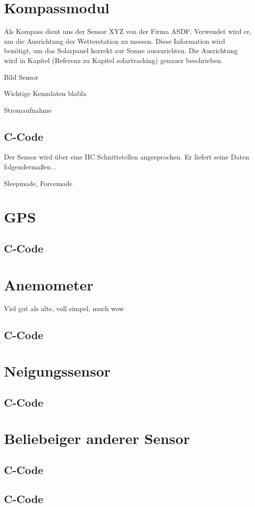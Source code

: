 \section{Kompassmodul}

Als Kompass dient uns der Sensor XYZ von der Firma ASDF. Verwendet wird er, um die Ausrichtung der Wetterstation zu messen. Diese Information wird benötigt, um das Solarpanel korrekt zur Sonne auszurichten. Die Ausrichtung wird in Kapitel (Referenz zu Kapitel solartracking) genauer beschrieben.

Bild Sensor

Wichtige Kenndaten blabla

Stromaufnahme

\subsection{C-Code}

Der Sensor wird über eine IIC Schnittstellen angesprochen. Er liefert seine Daten folgendermaßen...

Sleepmode, Forcemode

\section{GPS}

\subsection{C-Code}

\section{Anemometer}

Viel gut als alte, voll simpel, much wow

\subsection{C-Code}

\section{Neigungssensor}

\subsection{C-Code}

\section{Beliebeiger anderer Sensor}

\subsection{C-Code}

\subsection{C-Code}
